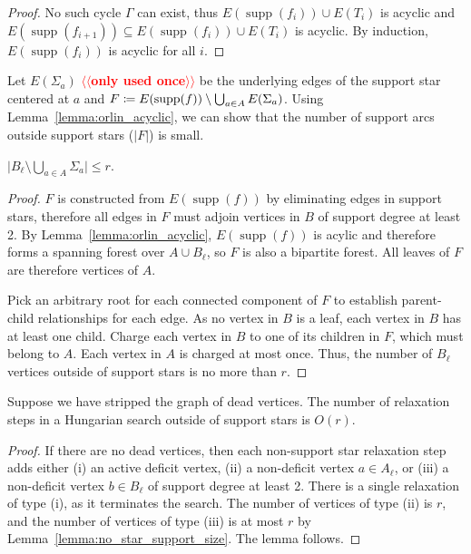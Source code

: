 \documentclass[a4paper,UKenglish]{socg-lipics-v2018}
\makeatletter
\def\note#1{\textcolor{red}{{#1}}}
\def\abs#1{\mathopen| #1 \mathclose|}		%
\def\supp{\operatorname{supp}}
\theoremstyle{plain}
\numberwithin{figure}{section}
\def\EMPH#1{\textbf{\emph{\boldmath #1}}}
\def\n@te#1{\textsf{\boldmath \textbf{$\langle\!\langle$#1$\rangle\!\rangle$}}\leavevmode}
\def\note#1{\textcolor{red}{\n@te{#1}}}
\makeatother
\begin{document}
\begin{toappendix}
\begin{proof}
No such cycle $\Gamma$ can exist, thus $E(\supp(f_i)) \cup E(T_i)$ is acyclic
and $E(\supp(f_{i+1})) \subseteq E(\supp(f_i)) \cup E(T_i)$ is acyclic.
By induction, $E(\supp(f_i))$ is acyclic for all $i$.
\end{proof}

Let \EMPH{$E(\Sigma_a)$} \note{only used once} be the underlying edges of the support star centered
at $a$ and $\EMPH{$F$} \coloneqq E(\supp(f)) \setminus \bigcup_{a \in A} E(\Sigma_a)$.
Using Lemma~\ref{lemma:orlin_acyclic}, we can show that the number of support
arcs outside support stars ($\abs{F}$) is small.

\begin{lemmarep}
\label{lemma:no_star_support_size}
$\abs{B_\ell \setminus \bigcup_{a \in A} \Sigma_a} \leq r$.
\end{lemmarep}

\begin{proof}
$F$ is constructed from $E(\supp(f))$ by eliminating edges in support stars,
therefore all edges in $F$ must adjoin vertices in $B$ of support degree at
least 2.
By Lemma~\ref{lemma:orlin_acyclic}, $E(\supp(f))$ is acylic and therefore forms
a spanning forest over $A \cup B_\ell$, so $F$ is also a bipartite forest.
All leaves of $F$ are therefore vertices of $A$.

Pick an arbitrary root for each connected component of $F$ to establish
parent-child relationships for each edge.
As no vertex in $B$ is a leaf, each vertex in $B$ has at least one child.
Charge each vertex in $B$ to one of its children in $F$, which must belong to $A$.
Each vertex in $A$ is charged at most once.
Thus, the number of $B_\ell$ vertices outside of support stars is no more than $r$.
\end{proof}

\end{toappendix}

\begin{lemmarep}
\label{lemma:orlin_relax_count}
Suppose we have stripped the graph of dead vertices.
The number of relaxation steps in a Hungarian search outside of support stars
is $O(r)$.
\end{lemmarep}

\begin{proof}
If there are no dead vertices, then each non-support star relaxation step adds
either
(i) an active deficit vertex,
(ii) a non-deficit vertex $a \in A_\ell$, or
(iii) a non-deficit vertex $b \in B_\ell$ of support degree at least 2.
There is a single relaxation of type (i), as it terminates the search.
The number of vertices of type (ii) is $r$, and the number of vertices of type
(iii) is at most $r$ by Lemma~\ref{lemma:no_star_support_size}.
The lemma follows.
\end{proof}
\end{document}
